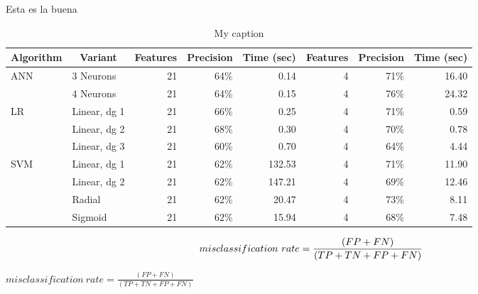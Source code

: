 \documentclass[10pt,letterpaper,oneside]{article}
\begin{document}
Esta es la buena


\begin{table}[]
	\centering
	\caption{My caption}
	\label{my-label}
	\begin{tabular}{llrrrrrr}
		\hline
		\multicolumn{1}{c}{\textbf{Algorithm}}  & \multicolumn{1}{c}{\textbf{Variant}} & \multicolumn{1}{p{1.5cm}}{\textbf{Features}} & \multicolumn{1}{c}{\textbf{Precision}} & \multicolumn{1}{p{1cm}}{\textbf{Time (sec)}} & \multicolumn{1}{p{1.5cm}}{\textbf{Features}} & \textbf{Precision} & \multicolumn{1}{p{1cm}}{\textbf{Time (sec)}} \\ \hline
		\multirow{2}{*}{ANN} & 3 Neurons    & 21  & 64\%  & 0.14   & 4  & 71\%   & 16.40   \\
							 & 4 Neurons    & 21  & 64\%  & 0.15   & 4  & 76\%   & 24.32    \\ \hline
		\multirow{3}{*}{LR}  & Linear, dg 1 & 21  & 66\%  & 0.25   & 4  & 71\%   & 0.59      \\
							 & Linear, dg 2 & 21  & 68\%  & 0.30   & 4  & 70\%   & 0.78       \\
							 & Linear, dg 3 & 21  & 60\%  & 0.70   & 4  & 64\%   & 4.44       \\ \hline
		\multirow{4}{*}{SVM} & Linear, dg 1 & 21  & 62\%  & 132.53 & 4  & 71\%   & 11.90      \\
							 & Linear, dg 2 & 21  & 62\%  & 147.21 & 4  & 69\%   & 12.46   \\
							 & Radial       & 21  & 62\%  & 20.47  & 4  & 73\%   & 8.11    \\
							 & Sigmoid      & 21  & 62\%  & 15.94  & 4  & 68\%   & 7.48   \\ \hline
	\end{tabular}
\end{table}



	\begin{equation}
	misclassification \ rate=\begin{tiny}   \frac{(FP+FN)}{(TP+TN+FP+FN)} \end{tiny}
	\end{equation}


$
misclassification \ rate=\frac{( FP+FN)}{(TP+TN+FP+FN)}
$
\end{document}
